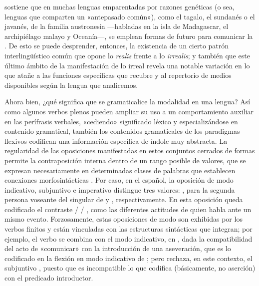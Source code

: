 \begin{recuadro}
\textcite{dahl2015} sostiene que en muchas lenguas emparentadas por razones
genéticas (o sea, lenguas que comparten un «antepasado común»), como el tagalo,
el sundanés o el javanés, de la familia austronesia ---habladas en la isla de
Madagascar, el archipiélago malayo y Oceanía---, se emplean formas de futuro
para comunicar la . De esto se puede desprender, entonces, la
existencia de un cierto patrón interlingüístico común que opone lo
\textit{realis} frente a lo \textit{irrealis}; y también que este último ámbito
de la manifestación de lo irreal revela una notable variación en lo que atañe a
las funciones específicas que recubre y al repertorio de medios disponibles
según la lengua que analicemos.
\end{recuadro}

Ahora bien, ¿qué significa que se gramaticalice la modalidad en una lengua? Así
como algunos verbos plenos pueden ampliar su uso a un comportamiento auxiliar en
las perífrasis verbales, «cediendo» significado léxico y especializándose en
contenido gramatical, también los contenidos gramaticales de los paradigmas
flexivos codifican una información específica de índole muy abstracta. La
regularidad de las oposiciones manifestadas en estos conjuntos cerrados de formas
permite la contraposición interna dentro de un rango posible de valores, que se
expresan necesariamente en determinadas clases de palabras que establecen
conexiones morfosintácticas \parencite{lehmann2002,giammatteo2018}. Por caso, en
el español, la oposición de modo indicativo, subjuntivo e imperativo distingue
tres valores: , para la segunda persona voseante del singular de  y
, respectivamente. En esta oposición queda codificado el contraste
 /  / , como las diferentes actitudes de
quien habla ante un mismo evento. Forzosamente, estas oposiciones de modo son
exhibidas por los verbos finitos y están vinculadas con las estructuras
sintácticas que integran; por ejemplo, el verbo  se combina con
el modo indicativo, en , dada la compatibilidad del acto
de «comunicar» con la introducción de una aseveración, que es lo codificado en
la flexión en modo indicativo de ; pero rechaza, en este contexto,
el subjuntivo , puesto que es incompatible lo que
codifica  (básicamente, no aserción) con el predicado introductor.

